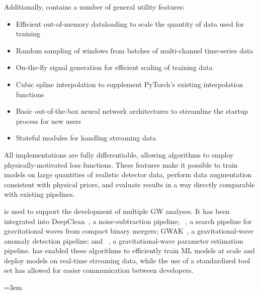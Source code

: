\begin{refsection}
Additionally, \mlgw contains a number of general utility features:

\begin{itemize}
    \item Efficient out-of-memory dataloading to scale the quantity of data used for training
    \item Random sampling of windows from batches of multi-channel time-series data
    \item On-the-fly signal generation for efficient scaling of training data
    \item Cubic spline interpolation to supplement PyTorch's existing interpolation functions
    \item Basic out-of-the-box neural network architectures to streamline the startup process for new users
    \item Stateful modules for handling streaming data
\end{itemize}

\begin{sloppypar}
All implementations are fully differentiable, allowing algorithms to employ physically-motivated loss functions.
These features make it possible to train models on large quantities of realistic detector data, perform data augmentation consistent with physical priors, and evaluate results in a way directly comparable with existing pipelines.
\end{sloppypar}

\mlgw is used to support the development of multiple GW analyses. 
It has been integrated into DeepClean~\cite{Saleem_2024}, a noise-subtraction pipeline; \aframe~\cite{aframe-methods}, a search pipeline for gravitational waves from compact binary mergers; GWAK~\cite{Raikman:2023ktu}, a gravitational-wave anomaly detection pipeline; and \amplfi~\cite{amplfi}, a gravitational-wave parameter estimation pipeline.
\mlgw has enabled these algorithms to efficiently train ML models at scale and deploy models on real-time streaming data, while the use of a standardized tool set has allowed for easier communication between developers.

\singlespacing
\begingroup
\emergencystretch=3em
\printbibliography[title=References,heading=subbibintoc]
\endgroup
\end{refsection}
